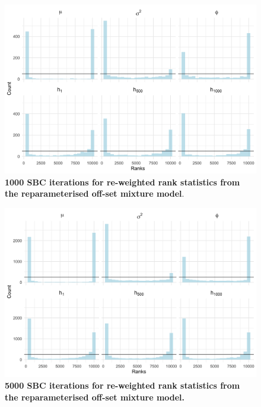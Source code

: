 \documentclass[12pt, a4paper]{article}
\begin{document}
\begin{figure}[H]
    \centering
    \includegraphics[scale=0.09]{results/weighted_ksc_ncp_1k.png}
    \caption{\textbf{1000 SBC iterations for re-weighted rank statistics from the reparameterised off-set mixture model}.}
    \label{fig:ncpreweight1k}
\end{figure}

\begin{figure}[H]
    \centering
    \includegraphics[scale=0.09]{results/weighted_ksc_ncp_5k.png}
    \caption{\textbf{5000 SBC iterations for re-weighted rank statistics from the reparameterised off-set mixture model.}}
    \label{fig:ncpreweight5k}
\end{figure}
\end{document}
